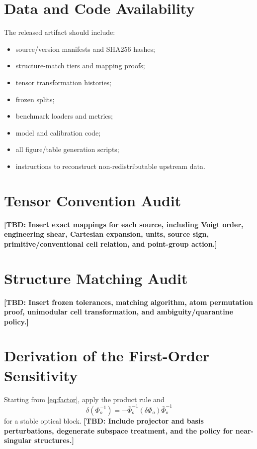 \documentclass[11pt]{article}
\newcommand{\TBD}[1]{\textcolor{red!75!black}{\textbf{[TBD: #1]}}}
\begin{document}
\section{Data and Code Availability}

The released artifact should include:
\begin{itemize}[leftmargin=1.5em]
    \item source/version manifests and SHA256 hashes;
    \item structure-match tiers and mapping proofs;
    \item tensor transformation histories;
    \item frozen splits;
    \item benchmark loaders and metrics;
    \item model and calibration code;
    \item all figure/table generation scripts;
    \item instructions to reconstruct non-redistributable upstream data.
\end{itemize}




\appendix

\section{Tensor Convention Audit}

\TBD{Insert exact mappings for each source, including Voigt order, engineering shear, Cartesian expansion, units, source sign, primitive/conventional cell relation, and point-group action.}

\section{Structure Matching Audit}

\TBD{Insert frozen tolerances, matching algorithm, atom permutation proof, unimodular cell transformation, and ambiguity/quarantine policy.}

\section{Derivation of the First-Order Sensitivity}

Starting from \cref{eq:factor}, apply the product rule and
\begin{equation}
\delta(\Phi_o^{-1})
=
-\bar\Phi_o^{-1}(\delta\Phi_o)\bar\Phi_o^{-1}
\end{equation}
for a stable optical block. \TBD{Include projector and basis perturbations, degenerate subspace treatment, and the policy for near-singular structures.}
\end{document}
